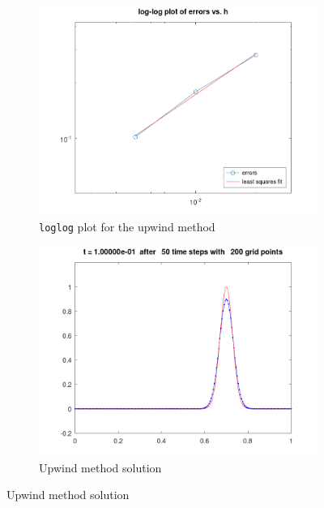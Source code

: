 \begin{solution}
    \begin{figure}[h]
        \centering
        \begin{subfigure}{0.45\textwidth}
            \includegraphics*[width=\textwidth]{problem_3b_error.png}
            \caption{\texttt{loglog} plot for the upwind method}
        \end{subfigure}
        \hfill
        \begin{subfigure}{0.45\textwidth}
            \includegraphics*[width=\textwidth]{problem_3b.png}
            \caption{Upwind method solution}
        \end{subfigure}
    \end{figure}
\end{solution}
